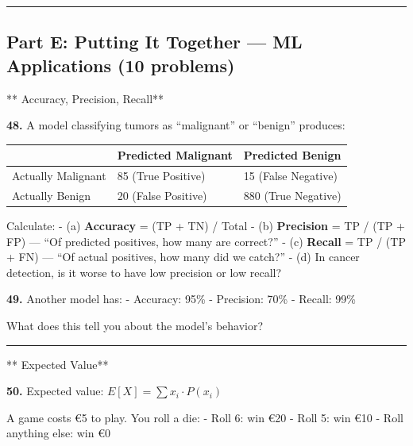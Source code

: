 \documentclass[
  11pt,
]{article}
\begin{document}
\begin{center}\rule{0.5\linewidth}{0.5pt}\end{center}

\hypertarget{part-e-putting-it-together-ml-applications-10-problems}{%
\subsection{Part E: Putting It Together --- ML Applications (10
problems)}\label{part-e-putting-it-together-ml-applications-10-problems}}

** Accuracy, Precision, Recall**

\textbf{48.} A model classifying tumors as ``malignant'' or ``benign''
produces:

\begin{longtable}[]{@{}lll@{}}
\toprule\noalign{}
& Predicted Malignant & Predicted Benign \\
\midrule\noalign{}
\endhead
\bottomrule\noalign{}
\endlastfoot
Actually Malignant & 85 (True Positive) & 15 (False Negative) \\
Actually Benign & 20 (False Positive) & 880 (True Negative) \\
\end{longtable}

Calculate: - (a) \textbf{Accuracy} = (TP + TN) / Total - (b)
\textbf{Precision} = TP / (TP + FP) --- ``Of predicted positives, how
many are correct?'' - (c) \textbf{Recall} = TP / (TP + FN) --- ``Of
actual positives, how many did we catch?'' - (d) In cancer detection, is
it worse to have low precision or low recall?

\textbf{49.} Another model has: - Accuracy: 95\% - Precision: 70\% -
Recall: 99\%

What does this tell you about the model's behavior?

\begin{center}\rule{0.5\linewidth}{0.5pt}\end{center}

** Expected Value**

\textbf{50.} Expected value: \(E[X] = \sum x_i \cdot P(x_i)\)

A game costs €5 to play. You roll a die: - Roll 6: win €20 - Roll 5: win
€10 - Roll anything else: win €0
\end{document}
